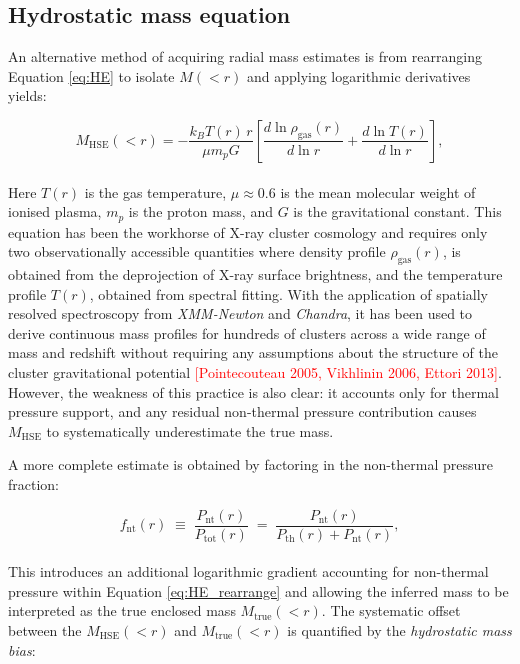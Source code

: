 \subsection*{Hydrostatic mass equation}
\label{sec:he_mass}

An alternative method of acquiring radial mass estimates is from rearranging Equation \ref{eq:HE} to isolate $M(<r)$ and applying logarithmic derivatives yields:

\begin{equation}
	M_\mathrm{HSE}(<r)
	= -\frac{k_B T(r)\, r}{\mu m_p G}
	\left[
	\frac{d\ln \rho_{\mathrm{gas}}(r)}{d\ln r}
	+ \frac{d\ln T(r)}{d\ln r} 	
	\right],
	\label{eq:HE_rearrange}
\end{equation}
\\
Here $T(r)$ is the gas temperature, $\mu \approx 0.6$ is the mean molecular weight of ionised plasma, $m_p$ is the proton mass, and $G$ is the gravitational constant. This equation has been the workhorse of X-ray cluster cosmology and requires only two observationally accessible quantities where density profile $\rho_{\mathrm{gas}}(r)$, is obtained from the deprojection of X-ray surface brightness, and the temperature profile $T(r)$, obtained from spectral fitting. With the application of spatially resolved spectroscopy from \textit{XMM-Newton} and \textit{Chandra}, it has been used to derive continuous mass profiles for hundreds of clusters across a wide range of mass and redshift without requiring any assumptions about the structure of the cluster gravitational potential \textcolor{red}{[Pointecouteau 2005, Vikhlinin 2006, Ettori 2013]}. However, the weakness of this practice is also clear: it accounts only for thermal pressure support, and any residual non-thermal pressure contribution causes $M_\mathrm{HSE}$ to systematically underestimate the true mass.

\pbreak
A more complete estimate is obtained by factoring in the non-thermal pressure fraction:

\begin{equation}
	f_{\mathrm{nt}}(r) \;\equiv\; \frac{P_{\mathrm{nt}}(r)}{P_{\mathrm{tot}}(r)}
	\;=\; \frac{P_{\mathrm{nt}}(r)}{P_{\mathrm{th}}(r) + P_{\mathrm{nt}}(r)},
	\label{eq:fnt_def}
\end{equation}
\\
This introduces an additional logarithmic gradient accounting for non-thermal pressure within Equation \ref{eq:HE_rearrange} and allowing the inferred mass to be interpreted as the true enclosed mass $M_{\mathrm{true}}(<r)$. The systematic offset between the $M_{\mathrm{HSE}}(<r)$ and $M_{\mathrm{true}}(<r)$ is quantified by the \emph{hydrostatic mass bias}:

